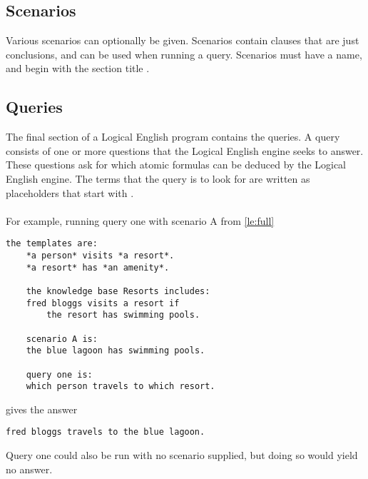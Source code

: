 \documentclass[../main.tex]{subfiles}
\begin{document}
\subsection{Scenarios}
Various scenarios can optionally be given. Scenarios contain clauses that are just conclusions, and can be used when running a query. Scenarios must have a name, and begin with the section title
. 

\subsection{Queries}
The final section of a Logical English program contains the queries. A query consists of one or more questions that the Logical English engine seeks to answer. These questions ask for which atomic formulas can be deduced by the Logical English engine. The terms that the query is to look for are written as placeholders that start with . 
\\
\\
For example, running query one with scenario A from \ref{le:full}
\begin{lstlisting}[language={LE},label={le:full},caption={Another short Logical English program.}]
    the templates are:
    *a person* visits *a resort*.
    *a resort* has *an amenity*.

    the knowledge base Resorts includes:
    fred bloggs visits a resort if
        the resort has swimming pools.

    scenario A is:
    the blue lagoon has swimming pools.

    query one is:
    which person travels to which resort.
\end{lstlisting}
gives the answer
\begin{lstlisting}[language={LE}]
    fred bloggs travels to the blue lagoon.
\end{lstlisting}
Query one could also be run with no scenario supplied, but doing so would yield no answer.
\end{document}
